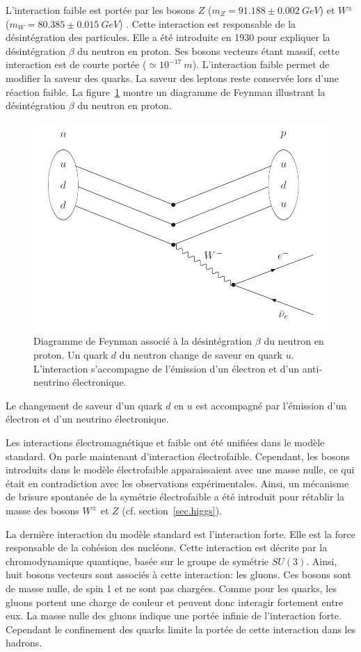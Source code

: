 L'interaction faible est portée par les bosons $Z$ ($m_Z=91.188\pm0.002~GeV$) et $W^\pm$ ($m_W=80.385\pm0.015~GeV$) \cite{pdg}. Cette interaction est responsable de la désintégration des particules. Elle a été introduite en 1930 pour expliquer la désintégration $\beta$ du neutron en proton. Ses bosons vecteurs étant massif, cette interaction est de courte portée ($\simeq10^{-17}~m$). L'interaction faible permet de modifier la saveur des quarks. La saveur des leptons reste conservée lors d'une réaction faible. La figure~\ref{fig:beta} montre un diagramme de Feynman illustrant la désintégration $\beta$ du neutron en proton. 
\begin{figure}[!ht]
  \begin{center}
    \includegraphics[width=.5\textwidth]{ModelStandard/figs/betaminus.png}
    \caption{Diagramme de Feynman associé à la désintégration $\beta$ du neutron en proton. Un quark $d$ du neutron change de saveur en quark $u$. L'interaction s'accompagne de l'émission d'un électron et d'un anti-neutrino électronique.}
    \label{fig:beta}
  \end{center}
\end{figure}
Le changement de saveur d'un quark $d$ en $u$ est accompagné par l'émission d'un électron et d'un neutrino électronique. 

Les interactions électromagnétique et faible ont été unifiées dans le modèle standard. On parle maintenant d’interaction électrofaible. Cependant, les bosons introduits dans le modèle électrofaible apparaissaient avec une masse nulle, ce qui était en contradiction avec les observations expérimentales. Ainsi, un mécanisme de brisure spontanée de la symétrie électrofaible a été introduit pour rétablir la masse des bosons $W^\pm$ et $Z$ (cf. section~\ref{sec.higgs}).

La dernière interaction du modèle standard est l'interaction forte. Elle est la force responsable de la cohésion des nucléons. Cette interaction est décrite par la chromodynamique quantique, basée sur le groupe de symétrie $SU(3)$. Ainsi, huit bosons vecteurs sont associés à cette interaction: les gluons. Ces bosons sont de masse nulle, de spin 1 et ne sont pas chargées. Comme pour les quarks, les gluons portent une charge de couleur et peuvent donc interagir fortement entre eux. La masse nulle des gluons indique une portée infinie de l'interaction forte. Cependant le confinement des quarks limite la portée de cette interaction dans les hadrons. 

